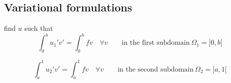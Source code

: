 \subsection{Variational formulations}
\label{sec:vari-form-1}
find $u$ such that
\begin{equation*}
  \int_0^b u_1'v' = \int_0^b fv \quad \forall v \qquad \text{in the first subdomain} ~\Omega_1 = ]0,b[
\end{equation*}

\begin{equation*}
  \int_a^1 u_2'v' = \int_a^1 fv \quad \forall v \qquad \text{in the second subdomain} ~ \Omega_2 = ]a,1[
\end{equation*}



